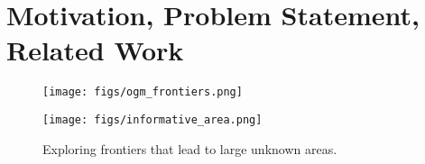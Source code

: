 \section{Motivation, Problem Statement, Related Work} \label{sec:introduction}
\begin{figure}[htbp] \vspace{-15pt}
    \centering
    \begin{minipage}[t]{0.3\linewidth}
        \centering
        \texttt{[image: figs/ogm\_frontiers.png]}
        \caption{
            Discrete occupancy grid map with frontiers pointed by arrows.
        }
        \label{fig:pull_figure_1}
    \end{minipage}
    \quad \quad 
    \begin{minipage}[t]{0.3\linewidth}
        \centering
        \texttt{[image: figs/informative\_area.png]}
        \caption{Exploring frontiers that lead to large unknown areas.}
        \label{fig:pull_figure_3}
    \end{minipage} %
\end{figure}

